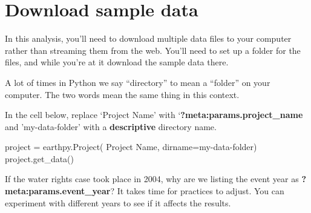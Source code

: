 \documentclass[
  letterpaper,
  DIV=11,
  numbers=noendperiod,
  oneside]{scrreprt}
\newenvironment{Shaded}{\begin{snugshade}}{\end{snugshade}}
\newcommand{\NormalTok}[1]{\textcolor[rgb]{0.00,0.23,0.31}{#1}}
\newcommand{\OperatorTok}[1]{\textcolor[rgb]{0.37,0.37,0.37}{#1}}
\newcommand{\StringTok}[1]{\textcolor[rgb]{0.13,0.47,0.30}{#1}}
\begin{document}
\section{Download sample data}\label{download-sample-data}

In this analysis, you'll need to download multiple data files to your
computer rather than streaming them from the web. You'll need to set up
a folder for the files, and while you're at it download the sample data
there.

\begin{tcolorbox}[enhanced jigsaw, colbacktitle=quarto-callout-caution-color!10!white, opacityback=0, bottomtitle=1mm, toptitle=1mm, bottomrule=.15mm, left=2mm, colframe=quarto-callout-caution-color-frame, leftrule=.75mm, opacitybacktitle=0.6, colback=white, rightrule=.15mm, toprule=.15mm, breakable, titlerule=0mm, title={GOTCHA ALERT!}, coltitle=black, arc=.35mm]

A lot of times in Python we say ``directory'' to mean a ``folder'' on
your computer. The two words mean the same thing in this context.

\end{tcolorbox}

\begin{tcolorbox}[enhanced jigsaw, colbacktitle=quarto-callout-color!10!white, opacityback=0, bottomtitle=1mm, toptitle=1mm, bottomrule=.15mm, left=2mm, colframe=quarto-callout-color-frame, leftrule=.75mm, opacitybacktitle=0.6, colback=white, rightrule=.15mm, toprule=.15mm, breakable, titlerule=0mm, title=\textcolor{quarto-callout-color}{\faInfo}\hspace{0.5em}{Try It}, coltitle=black, arc=.35mm]

In the cell below, replace `Project Name' with
`\textbf{?meta:params.project\_name} and 'my-data-folder' with a
\textbf{descriptive} directory name.

\end{tcolorbox}

\begin{Shaded}
\begin{Highlighting}[]
\NormalTok{project }\OperatorTok{=}\NormalTok{ earthpy.Project(}
    \StringTok{\textquotesingle{}Project Name\textquotesingle{}}\NormalTok{, dirname}\OperatorTok{=}\StringTok{\textquotesingle{}my{-}data{-}folder\textquotesingle{}}\NormalTok{)}
\NormalTok{project.get\_data()}
\end{Highlighting}
\end{Shaded}

If the water rights case took place in 2004, why are we listing the
event year as \textbf{?meta:params.event\_year}? It takes time for
practices to adjust. You can experiment with different years to see if
it affects the results.
\end{document}
